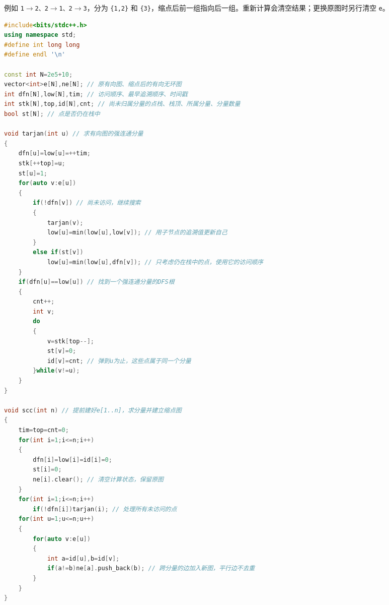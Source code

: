 \documentclass[10pt,landscape,a4paper]{article}
\begin{document}
\begin{multicols*}{3}
例如 \texttt{1\allowbreak{}\ensuremath{\to}\allowbreak{}2\allowbreak{}、\allowbreak{}2\allowbreak{}\ensuremath{\to}\allowbreak{}1\allowbreak{}、\allowbreak{}2\allowbreak{}\ensuremath{\to}\allowbreak{}3}，分为 \texttt{\{\allowbreak{}1\allowbreak{},\allowbreak{}2\allowbreak{}\}} 和 \texttt{\{\allowbreak{}3\allowbreak{}\}}，缩点后前一组指向后一组。重新计算会清空结果；更换原图时另行清空 \texttt{e}。\par
\par{}\par
\begin{lstlisting}[language=C++]
#include<bits/stdc++.h>
using namespace std;
#define int long long
#define endl '\n'

const int N=2e5+10;
vector<int>e[N],ne[N]; // 原有向图、缩点后的有向无环图
int dfn[N],low[N],tim; // 访问顺序、最早追溯顺序、时间戳
int stk[N],top,id[N],cnt; // 尚未归属分量的点栈、栈顶、所属分量、分量数量
bool st[N]; // 点是否仍在栈中

void tarjan(int u) // 求有向图的强连通分量
{
    dfn[u]=low[u]=++tim;
    stk[++top]=u;
    st[u]=1;
    for(auto v:e[u])
    {
        if(!dfn[v]) // 尚未访问，继续搜索
        {
            tarjan(v);
            low[u]=min(low[u],low[v]); // 用子节点的追溯值更新自己
        }
        else if(st[v])
            low[u]=min(low[u],dfn[v]); // 只考虑仍在栈中的点，使用它的访问顺序
    }
    if(dfn[u]==low[u]) // 找到一个强连通分量的DFS根
    {
        cnt++;
        int v;
        do
        {
            v=stk[top--];
            st[v]=0;
            id[v]=cnt; // 弹到u为止，这些点属于同一个分量
        }while(v!=u);
    }
}

void scc(int n) // 提前建好e[1..n]，求分量并建立缩点图
{
    tim=top=cnt=0;
    for(int i=1;i<=n;i++)
    {
        dfn[i]=low[i]=id[i]=0;
        st[i]=0;
        ne[i].clear(); // 清空计算状态，保留原图
    }
    for(int i=1;i<=n;i++)
        if(!dfn[i])tarjan(i); // 处理所有未访问的点
    for(int u=1;u<=n;u++)
    {
        for(auto v:e[u])
        {
            int a=id[u],b=id[v];
            if(a!=b)ne[a].push_back(b); // 跨分量的边加入新图，平行边不去重
        }
    }
}
\end{lstlisting}

\end{multicols*}
\end{document}

